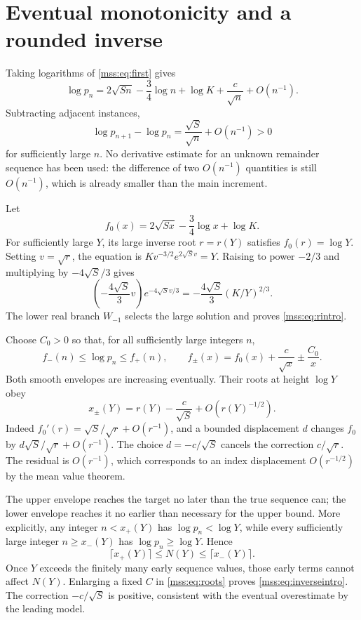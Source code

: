 \documentclass[11pt,letterpaper]{article}
\numberwithin{equation}{section}
\theoremstyle{definition}\newtheorem{definition}[theorem]{Definition}
\theoremstyle{remark}\newtheorem{remark}[theorem]{Remark}
\begin{document}
\section{Eventual monotonicity and a rounded inverse}\label{mss:sec:inverse}
Taking logarithms of \eqref{mss:eq:first} gives
\begin{equation}\label{mss:eq:logpn}
\log p_n=2\sqrt{Sn}-\frac34\log n+\log K
+\frac c{\sqrt n}+O(n^{-1}).
\end{equation}
Subtracting adjacent instances,
\begin{equation}\label{mss:eq:logratio}
\log p_{n+1}-\log p_n=\frac{\sqrt S}{\sqrt n}+O(n^{-1})>0
\end{equation}
for sufficiently large $n$. No derivative estimate for an unknown remainder sequence has been used: the difference of two $O(n^{-1})$ quantities is still $O(n^{-1})$, which is already smaller than the main increment.

Let
\begin{equation}\label{mss:eq:f0}
f_0(x)=2\sqrt{Sx}-\frac34\log x+\log K.
\end{equation}
For sufficiently large $Y$, its large inverse root $r=r(Y)$ satisfies $f_0(r)=\log Y$. Setting $v=\sqrt r$, the equation is $K v^{-3/2}e^{2\sqrt S v}=Y$. Raising to power $-2/3$ and multiplying by $-4\sqrt S/3$ gives
\[
\left(-\frac{4\sqrt S}3v\right)e^{-4\sqrt S v/3}
=-\frac{4\sqrt S}3(K/Y)^{2/3}.
\]
The lower real branch $W_{-1}$ selects the large solution and proves \eqref{mss:eq:rintro}.

Choose $C_0>0$ so that, for all sufficiently large integers $n$,
\begin{equation}\label{mss:eq:envelopes}
f_-(n)\le\log p_n\le f_+(n),\qquad
f_\pm(x)=f_0(x)+\frac c{\sqrt x}\pm\frac{C_0}{x}.
\end{equation}
Both smooth envelopes are increasing eventually. Their roots at height $\log Y$ obey
\begin{equation}\label{mss:eq:roots}
x_\pm(Y)=r(Y)-\frac c{\sqrt S}+O(r(Y)^{-1/2}).
\end{equation}
Indeed $f_0'(r)=\sqrt S/\sqrt r+O(r^{-1})$, and a bounded displacement $d$ changes $f_0$ by $d\sqrt S/\sqrt r+O(r^{-1})$. The choice $d=-c/\sqrt S$ cancels the correction $c/\sqrt r$. The residual is $O(r^{-1})$, which corresponds to an index displacement $O(r^{-1/2})$ by the mean value theorem.

The upper envelope reaches the target no later than the true sequence can; the lower envelope reaches it no earlier than necessary for the upper bound. More explicitly, any integer $n<x_+(Y)$ has $\log p_n<\log Y$, while every sufficiently large integer $n\ge x_-(Y)$ has $\log p_n\ge\log Y$. Hence
\[
\lceil x_+(Y)\rceil\le N(Y)\le\lceil x_-(Y)\rceil.
\]
Once $Y$ exceeds the finitely many early sequence values, those early terms cannot affect $N(Y)$. Enlarging a fixed $C$ in \eqref{mss:eq:roots} proves \eqref{mss:eq:inverseintro}. The correction $-c/\sqrt S$ is positive, consistent with the eventual overestimate by the leading model.
\end{document}
